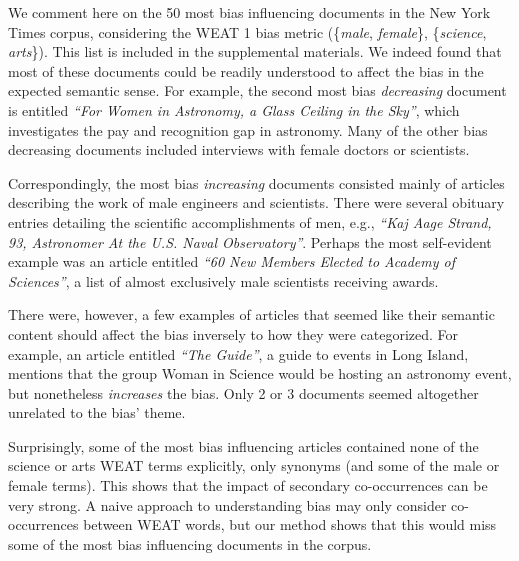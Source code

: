 \documentclass{article}
\begin{document}

We comment here on the 50 most bias influencing documents in the New York Times corpus, considering the WEAT 1 bias metric (\{\textit{male}, \textit{female}\}, \{\textit{science}, \textit{arts}\}).
This list is included in the supplemental materials. 
We indeed found that most of these documents could be readily understood to affect the bias in the expected semantic sense. 
For example, the second most bias \textit{decreasing} document is entitled \textit{``For Women in Astronomy, a Glass Ceiling in the Sky''}, which investigates the pay and recognition gap in astronomy. 
Many of the other bias decreasing documents included interviews with female doctors or scientists.

Correspondingly, the most bias \textit{increasing} documents consisted mainly of articles describing the work of male engineers and scientists.
There were several obituary entries detailing the scientific accomplishments of men, e.g., \textit{``Kaj Aage Strand, 93, Astronomer At the U.S. Naval Observatory''}.
Perhaps the most self-evident example was an article entitled \textit{``60 New Members Elected to Academy of Sciences''}, a list of almost exclusively male scientists receiving awards. 

There were, however, a few examples of articles that seemed like their semantic content should affect the bias inversely to how they were categorized.
For example, an article entitled  \textit{``The Guide''}, a guide to events in Long Island, mentions that the group Woman in Science would be hosting an astronomy event, but nonetheless \textit{increases} the bias. 
Only 2 or 3 documents seemed altogether unrelated to the bias' theme.

Surprisingly, some of the most bias influencing articles contained none of the science or arts WEAT terms explicitly, only synonyms (and some of the male or female terms).
This shows that the impact of secondary co-occurrences can be very strong.
A naive approach to understanding bias may only consider co-occurrences between WEAT words, but our method shows that this would miss some of the most bias influencing documents in the corpus.
\end{document}
